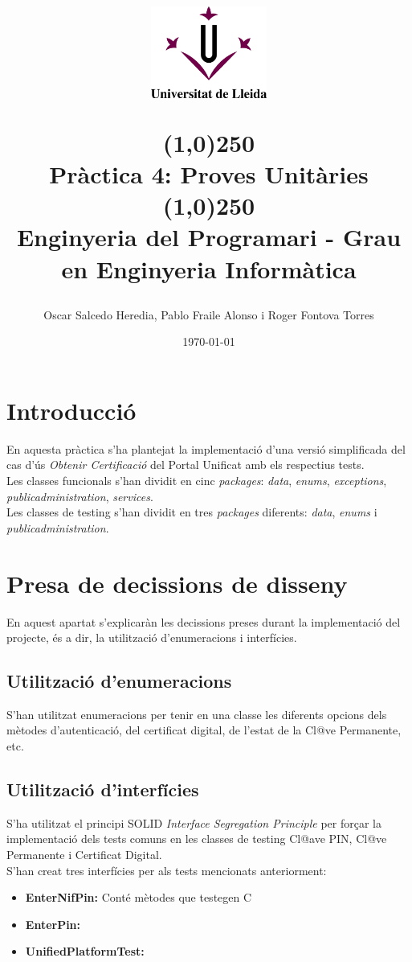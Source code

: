 \documentclass[12pt, letterpaper]{article}
\title{%
    \begin{center}
	\includegraphics[width=4cm,height=3cm]{udl.png}
    \end{center}
    \line(1,0){250}\\[0.3cm]
    \textbf{Pràctica 4: Proves Unitàries}
    \line(1,0){250}
    \\[0.5cm]
	\large Enginyeria del Programari - Grau en Enginyeria Informàtica
}
\author{Oscar Salcedo Heredia, Pablo Fraile Alonso i Roger Fontova Torres}
\date{\today}
\begin{document}
    
\maketitle
\thispagestyle{empty}
\newpage
\tableofcontents
\newpage


\section{Introducció}
\label{introduction}
En aquesta pràctica s'ha plantejat la implementació d'una versió simplificada del cas d'ús  \textit{Obtenir Certificació} del Portal Unificat amb els respectius tests. \\

Les classes funcionals s'han dividit en cinc \textit{packages}: \textit{data}, \textit{enums}, \textit{exceptions}, \textit{publicadministration}, \textit{services}. \\

Les classes de testing s'han dividit en tres \textit{packages} diferents: \textit{data}, \textit{enums} i \textit{publicadministration}.


\section{Presa de decissions de disseny}
\label{decissisions}
En aquest apartat s'explicaràn les decissions preses durant la implementació del projecte, és a dir, la utilització d'enumeracions i interfícies.

\subsection{Utilització d'enumeracions}
\label{enumeracions}
S'han utilitzat enumeracions per tenir en una classe les diferents opcions dels mètodes d'autenticació, del certificat digital, de l'estat de la Cl@ve Permanente, etc.

\subsection{Utilització d'interfícies}
\label{interfaces}
S'ha utilitzat el principi SOLID \textit{Interface Segregation Principle} per forçar la implementació dels tests comuns en les classes de testing Cl@ave PIN, Cl@ve Permanente i Certificat Digital. \\

S'han creat tres interfícies per als tests mencionats anteriorment:
\begin{itemize}
  \item \textbf{EnterNifPin:} Conté mètodes que testegen C
  \item \textbf{EnterPin:}
  \item \textbf{UnifiedPlatformTest:}
\end{itemize}
\end{document}
